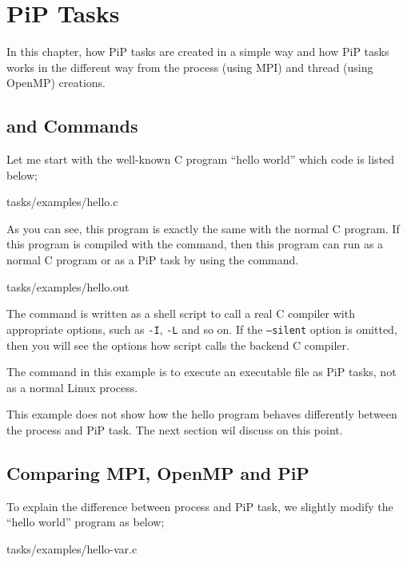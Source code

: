 
\section{PiP Tasks}

In this chapter, how PiP tasks are created in a simple way and how PiP
tasks works in the different way from the process (using MPI) and
thread (using OpenMP) creations.

\subsection{ and  Commands}
\label{sec:pipcc-exec}

Let me start with the well-known C program ``hello world'' which code
is listed below;


                {tasks/examples/hello.c}

As you can see, this program is exactly the same with the normal C
program. If this program is compiled with the  command,
then this program can run as a normal C program or as a PiP task by
using the  command.


                {tasks/examples/hello.out}

The  command is written as a shell script to call a real
C compiler with appropriate options, such as {\tt -I}, {\tt -L} and so
on. If the {\tt --silent} option is omitted, then you will see the
options how  script calls the backend C compiler.

The  command in this example is to execute an
executable file as PiP tasks, not as a normal Linux process.

This example does not show how the hello program behaves differently
between the process and PiP task. The next section wil discuss on this
point.

\subsection{Comparing MPI, OpenMP and PiP}

To explain the difference between process and PiP task, we slightly
modify the ``hello world'' program as below;

 {tasks/examples/hello-var.c}

